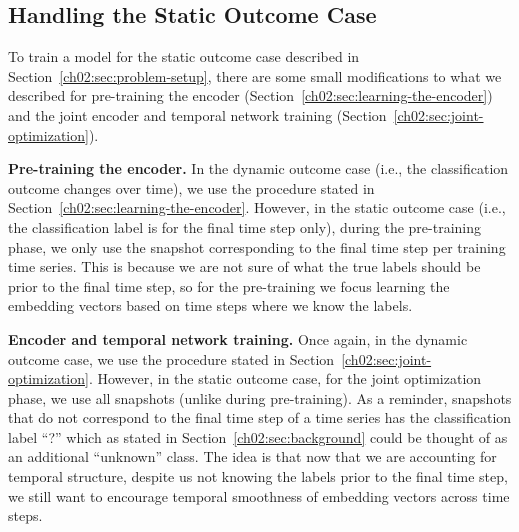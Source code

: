 \subsection{Handling the Static Outcome Case}
\label{ch02:sec:handling-static-outcome}

To train a  model for the static outcome case described in Section~\ref{ch02:sec:problem-setup}, there are some small modifications to what we described for pre-training the encoder (Section~\ref{ch02:sec:learning-the-encoder}) and the joint encoder and temporal network training (Section~\ref{ch02:sec:joint-optimization}).


\noindent
\textbf{Pre-training the encoder.}
In the dynamic outcome case (i.e., the classification outcome changes over time), we use the procedure stated in Section~\ref{ch02:sec:learning-the-encoder}.
However, in the static outcome case (i.e., the classification label is for the final time step only), during the pre-training phase, we only use the snapshot corresponding to the final time step per training time series.
This is because we are not sure of what the true labels should be prior to the final time step, so for the pre-training we focus learning the embedding vectors based on time steps where we know the labels.


\noindent
\textbf{Encoder and temporal network training.} Once again, in the dynamic outcome case, we use the procedure stated in Section~\ref{ch02:sec:joint-optimization}. However, in the static outcome case, for the joint optimization phase, we use all snapshots (unlike during pre-training). As a reminder, snapshots that do not correspond to the final time step of a time series has the classification label ``?'' which as stated in Section~\ref{ch02:sec:background} could be thought of as an additional ``unknown'' class. The idea is that now that we are accounting for temporal structure, despite us not knowing the labels prior to the final time step, we still want to encourage temporal smoothness of embedding vectors across time steps.

